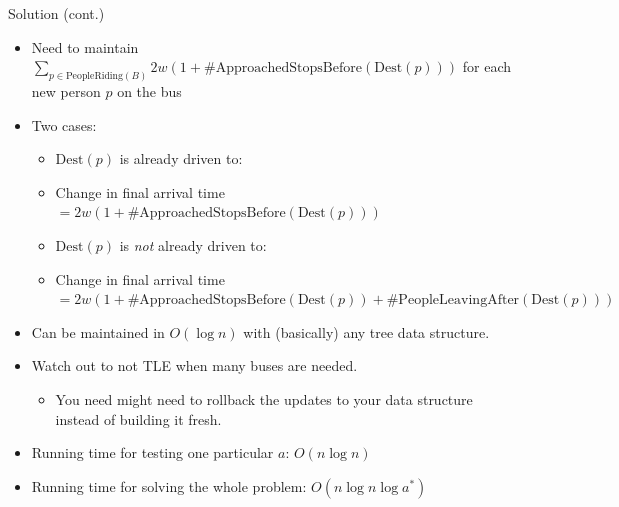 \begin{frame}
	\begin{block}{Solution (cont.)}
    \begin{itemize}
      \item<1-> Need to maintain \(\sum_{p\in \mathrm{PeopleRiding}(B)} 2w(1 + \#\mathrm{ApproachedStopsBefore}(\mathrm{Dest}(p)))\) for each new person $p$ on the bus
      \item<2-> Two cases:
      \begin{itemize}
        \item<3-> $\mathrm{Dest}(p)$ is already driven to:
        \item<4->[] Change in final arrival time \(= 2w(1 + \#\mathrm{ApproachedStopsBefore}(\mathrm{Dest}(p)))\)
        \item<5-> $\mathrm{Dest}(p)$ is \emph{not} already driven to:
        \item<6->[] Change in final arrival time \(= 2w(1 + \#\mathrm{ApproachedStopsBefore}(\mathrm{Dest}(p)) + \#\mathrm{PeopleLeavingAfter}(\mathrm{Dest}(p)))\)
      \end{itemize}
      \item<7-> Can be maintained in \(O(\log n)\) with (basically) any tree data structure.
      \item<8-> Watch out to not TLE when many buses are needed.
      \begin{itemize}
        \item<9-> You need might need to rollback the updates to your data structure instead of building it fresh.
      \end{itemize}
      \item<10-> Running time for testing one particular $a$: \(O(n \log n)\)
      \item<11-> Running time for solving the whole problem: \(O(n \log n \log a^{*})\)
    \end{itemize}
	\end{block}
\end{frame}
